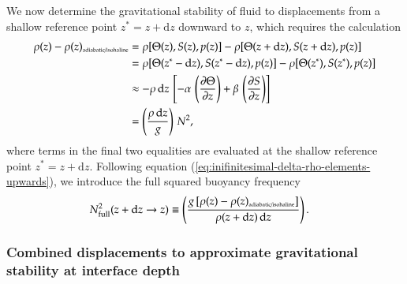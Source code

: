 We now determine the gravitational stability of fluid to displacements
from a shallow reference point $z^{*} = z + \mathrm{d}z$ downward to
$z$, which requires the calculation
\begin{equation}
\begin{split}
\rho(z)  - \rho(z)_{\mbox{\tiny adiabatic/isohaline}}  
&= 
 \rho[ \Theta(z), S(z), p(z)]
-
\rho[ \Theta(z+\mathrm{d}z), S(z+\mathrm{d}z), p(z)]
\\
 &=
 \rho[ \Theta(z^{*}-\mathrm{d}z), S(z^{*}-\mathrm{d}z), p(z)]
-
\rho[ \Theta(z^{*}), S(z^{*}), p(z)]
\\
&\approx 
 -\rho \, \mathrm{d}z \, \left[ 
   -\alpha \, \left( \frac{\partial \Theta}{\partial z} \right )
  + \beta \, \left( \frac{\partial S}{\partial z} \right) \right]
 \\
&=
\left( \frac{\rho \, \mathrm{d}z}{g} \right) \, N^{2},
\end{split}
\label{eq:inifinitesimal-delta-rho-elements-downward}
\end{equation}
where terms in the final two equalities are evaluated at the shallow
reference point $z^{*} = z + \mathrm{d}z$.  Following equation
(\ref{eq:inifinitesimal-delta-rho-elements-upwards}), we introduce the
full squared buoyancy frequency
\begin{equation}
\begin{split}
 N^{2}_{\mbox{\scriptsize full}}(z +\mathrm{d}z \rightarrow z) &\equiv 
 \left( \frac{g \, [ \rho(z)  - \rho(z)_{\mbox{\tiny adiabatic/isohaline}} ] } {\rho(z+\mathrm{d}z) \, \mathrm{d}z} \right).
\end{split}
\label{eq:inifinitesimal-delta-rho-elements-downwards}
\end{equation}



\subsubsection{Combined displacements to approximate gravitational stability at
  interface depth}

